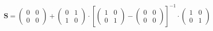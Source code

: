\[ \mathbf{S} = \left(\begin{array}{cc} 0 & 0 \\ 0 & 0
\end{array}\right) + \left(\begin{array}{cc} 0 & 1 \\ 1 & 0
\end{array}\right) \cdot \left[ \left(\begin{array}{cc} 1 & 0 \\ 0 & 1
\end{array}\right) - \left(\begin{array}{cc} 0 & 0 \\ 0 & 0
\end{array}\right) \right]^{-1} \cdot\left(\begin{array}{cc} 1 & 0 \\
0 & 1 \end{array}\right) \]
